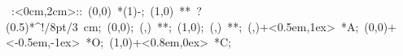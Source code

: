 %


\hbox{
\xy    <2cm,0cm>:<0cm,2cm>::
       (0,0) *\ellipse(1){-}; 
       (1,0) **\dir{-} ?(0.5)*^!/8pt/\hbox{3 cm};
       (0,0); (\halfroottwo,\halfroottwo) **\dir{-};
       (1,0); (\halfroottwo,\halfroottwo) **\dir{-};
       (\halfroottwo,\halfroottwo)+<0.5em,1ex> *{A};
       (0,0)+<-0.5em,-1ex> *{O};
       (1,0)+<0.8em,0ex> *{C};
\endxy}

